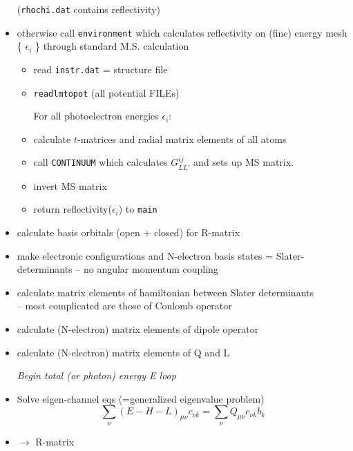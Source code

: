 \documentclass[landscape]{slides}
\begin{document}
\begin{slide}
\begin{itemize}
({\tt rhochi.dat} contains reflectivity)

\item otherwise call {\tt environment}
which calculates reflectivity on (fine) energy mesh \{  $\epsilon_i$
\} through standard M.S. calculation
\begin{itemize}

\item read {\tt instr.dat} = structure file 

\item {\tt readlmtopot} \quad (all potential FILEs)

For all photoelectron energies $\epsilon_i$:

\item  calculate $t$-matrices and radial matrix elements
of all atoms

\item  call {\tt CONTINUUM} 
which calculates $G^{ij}_{LL'}$ and sets up MS matrix.

\item invert MS matrix

\item return reflectivity($\epsilon_i$) to {\tt main}

\end{itemize}


\item
calculate basis orbitals (open + closed) for R-matrix

\item
make electronic configurations and N-electron basis states =
Slater-determinants -- no angular momentum coupling

\item
calculate matrix elements of hamiltonian between Slater determinants\\
-- most complicated are those of Coulomb operator


\item
calculate (N-electron) matrix elements of dipole operator

\item
calculate (N-electron) matrix elements of Q and L


{\it Begin total (or photon) energy E loop}

\item
Solve eigen-channel eqs (=generalized eigenvalue problem)
\[
\sum_{\nu} (E-H-L)_{\mu\nu} c_{\nu k}  = \sum_{\nu} Q_{\mu\nu} c_{\nu k} b_k 
\]
\item $\rightarrow$ R-matrix


\end{itemize}
\end{slide}
\end{document}
